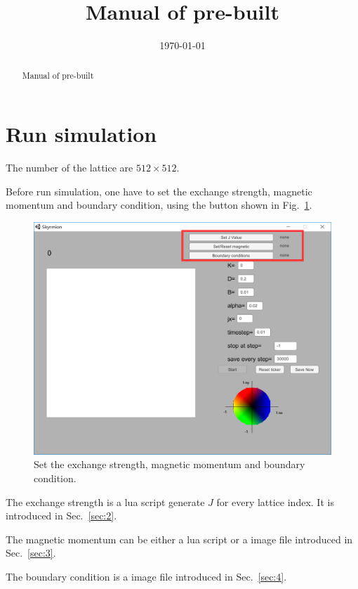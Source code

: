\documentclass[aps,superscriptaddress,groupedaddress]{revtex4}  %
\begin{document}
\widetext

\title{Manual of pre-built}

\date{\today}


\begin{abstract}
Manual of pre-built
\end{abstract}

\maketitle

\section{\label{sec:1}Run simulation}

The number of the lattice are $512\times 512$.

Before run simulation, one have to set the exchange strength, magnetic momentum and boundary condition, using the button shown in Fig.~\ref{Fig:intro1}.
\begin{figure}
\includegraphics[scale=0.3]{intro1.png}
\caption{\label{Fig:intro1}Set the exchange strength, magnetic momentum and boundary condition.}
\end{figure}

The exchange strength is a lua script generate $J$ for every lattice index. It is introduced in Sec.~\ref{sec:2}.

The magnetic momentum can be either a lua script or a image file introduced in Sec.~\ref{sec:3}.

The boundary condition is a image file introduced in Sec.~\ref{sec:4}.
\end{document}
